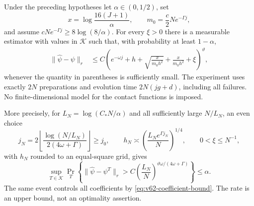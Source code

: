 \begin{theorem}
\label{thm:v62-budget}
Under the preceding hypotheses let $\alpha\in(0,1/2)$, set
\[
 x=\log\frac{16(J+1)}\alpha,
 \qquad m_0=\frac c2N e^{-\Gamma j},
\]
and assume $cNe^{-\Gamma j}\ge8\log(8/\alpha)$.
For every $\xi>0$ there is a measurable estimator with values in
$\mathcal K$ such that, with probability at least $1-\alpha$,
\begin{align}
 \|\widehat\psi-\psi\|_r
   &\le C\left(e^{-\omega j}+h+
          \sqrt{\frac{x}{m_0h^2}}+
                    \frac{x}{m_0h^2}+\xi\right)^\vartheta,
                    \label{eq:v62-budget-bound}
\end{align}
whenever the quantity in parentheses is sufficiently small.
The experiment uses exactly $2N$ preparations and evolution time
$2N(jg+d)$, including all failures.  No finite-dimensional model for the
contact functions is imposed.

More precisely, for $L_N=\log(C_*N/\alpha)$ and all sufficiently large
$N/L_N$, an even choice
\begin{equation}\label{eq:v62-optimal-schedule}
 j_N=2\left\lfloor
       \frac{\log(N/L_N)}{2(4\omega+\Gamma)}\right\rfloor\ge j_0,
 \qquad h_N\asymp
        \left(\frac{L_N e^{\Gamma j_N}}{N}\right)^{1/4},
 \qquad 0<\xi\le N^{-1},
\end{equation}
with $h_N$ rounded to an equal-square grid, gives
\begin{equation}\label{eq:v62-budget-rate}
 \sup_{T\in\mathcal K}\Pr_T\left\{
  \|\widehat\psi-\psi^T\|_r>
        C\left(\frac{L_N}{N}\right)^{
                     \vartheta\omega/(4\omega+\Gamma)}\right\}
 \le\alpha.
\end{equation}
The same event controls all coefficients by
\eqref{eq:v62-coefficient-bound}.  The rate is an upper bound, not an
optimality assertion.
\end{theorem}

